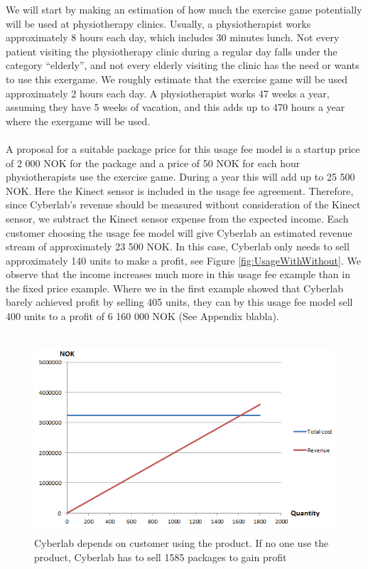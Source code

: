 We will start by making an estimation of how much the exercise game potentially will be used at physiotherapy clinics. Usually, a physiotherapist works approximately 8 hours each day, which includes 30 minutes lunch. Not every patient visiting the physiotherapy clinic during a regular day falls under the category “elderly”, and not every elderly visiting the clinic has the need or wants to use this exergame. We roughly estimate that the exercise game will be used approximately 2 hours each day. A physiotherapist works 47 weeks a year, assuming they have 5 weeks of vacation, and this adds up to 470 hours a year where the exergame will be used.\\ \\
A proposal for a suitable package price for this usage fee model is a startup price of 2 000 NOK for the package and a price of 50 NOK for each hour physiotherapists use the exercise game. During a year this will add up to 25 500 NOK. Here the Kinect sensor is included in the usage fee agreement. Therefore, since Cyberlab’s revenue should be measured without consideration of the Kinect sensor, we subtract the Kinect sensor expense from the expected income. Each customer choosing the usage fee model will give Cyberlab an estimated revenue stream of approximately 23 500 NOK. In this case, Cyberlab only needs to sell approximately 140 units to make a profit, see Figure \ref{fig:UsageWithWithout}. We observe that the income increases much more in this usage fee example than in the fixed price example. Where we in the first example showed that Cyberlab barely achieved profit by selling 405 units, they can by this usage fee model sell 400 units to a profit of 6 160 000 NOK (See Appendix blabla). \\ \\	
\begin{figure}
\begin{center}
\includegraphics[scale=0.8]{revenuestreamlicense}
\caption[Usage fee example - only sales]{Cyberlab depends on customer using the product. If no one use the product, Cyberlab has to sell 1585 packages to gain profit}
\label{fig:RevenueStreamLicense}
\end{center}
\end{figure}
